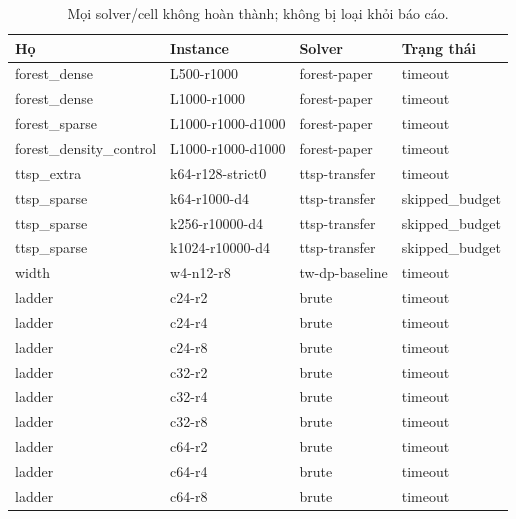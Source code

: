 \begin{table}[htbp]
\centering
\small
\setlength{\tabcolsep}{4pt}
\caption{Mọi solver/cell không hoàn thành; không bị loại khỏi báo cáo.}
\label{tab:censored}
\begin{tabular}{llll}
\toprule
Họ & Instance & Solver & Trạng thái \\
\midrule
forest\_dense & L500-r1000 & forest-paper & timeout \\
forest\_dense & L1000-r1000 & forest-paper & timeout \\
forest\_sparse & L1000-r1000-d1000 & forest-paper & timeout \\
forest\_density\_control & L1000-r1000-d1000 & forest-paper & timeout \\
ttsp\_extra & k64-r128-strict0 & ttsp-transfer & timeout \\
ttsp\_sparse & k64-r1000-d4 & ttsp-transfer & skipped\_budget \\
ttsp\_sparse & k256-r10000-d4 & ttsp-transfer & skipped\_budget \\
ttsp\_sparse & k1024-r10000-d4 & ttsp-transfer & skipped\_budget \\
width & w4-n12-r8 & tw-dp-baseline & timeout \\
ladder & c24-r2 & brute & timeout \\
ladder & c24-r4 & brute & timeout \\
ladder & c24-r8 & brute & timeout \\
ladder & c32-r2 & brute & timeout \\
ladder & c32-r4 & brute & timeout \\
ladder & c32-r8 & brute & timeout \\
ladder & c64-r2 & brute & timeout \\
ladder & c64-r4 & brute & timeout \\
ladder & c64-r8 & brute & timeout \\
\bottomrule
\end{tabular}
\end{table}
